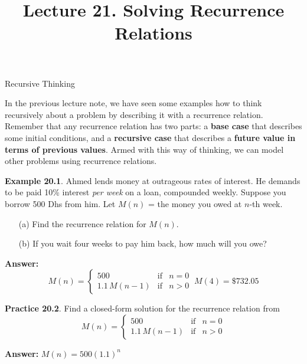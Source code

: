 \documentclass[aspectratio=169]{beamer}
\title{Lecture 21. Solving Recurrence Relations }
\date{ }
\begin{document}
\frame[plain]{\titlepage}

\begin{frame}[plain]{Recursive Thinking}

In the previous lecture note, we have seen some examples 
how to think recursively about a problem by describing it
with a recurrence relation.
 Remember that any recurrence relation has two parts: a {\bf base case}
that describes some initial conditions, and a {\bf recursive case}
 that describes a {\bf future value in
terms of previous values}. 
Armed with this way of thinking, we can model other problems using
recurrence relations.
\medskip
\pause

{\bf Example 20.1}. Ahmed lends money at outrageous rates of interest. 
He demands to be paid
     10\% interest \emph{per week} on a loan, compounded weekly.
     Suppose you borrow 500 Dhs from him.
      Let $M(n)$ = the money you owed at $n$-th week.
     \begin{itemize}
       \item[(a)]  Find the recurrence relation for $M(n)$. 
       \item[(b)] If you wait four weeks to pay him back, how much will you owe?
     \end{itemize}
\pause

\smallskip

{\bf Answer:} 
\[ M(n) = \left\{ \begin{array}{ccc}
                       500 &\mbox{if}& n = 0\\
                       1.1\,M(n-1) &\mbox{if}& n>0
                      \end{array} \right. 
              \ M(4) = \$ 732.05
    \]

\end{frame}

\begin{frame}[plain]{}

  {\bf Practice 20.2}. Find a closed-form solution 
  for the recurrence relation from
  \[ M(n) = \left\{ \begin{array}{ccc}
                       500 &\mbox{if}& n = 0\\
                       1.1\,M(n-1) &\mbox{if}& n>0
                      \end{array} \right. 
    \]
    
    \pause
    
 {\bf Answer:} $M(n) = 500 (1.1)^n$ %
 
 \vspace{1in}
 
\end{frame}
\end{document}
